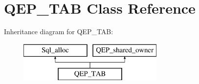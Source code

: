 \hypertarget{classQEP__TAB}{}\section{Q\+E\+P\+\_\+\+T\+AB Class Reference}
\label{classQEP__TAB}
Inheritance diagram for Q\+E\+P\+\_\+\+T\+AB\+:\begin{figure}[H]
\begin{center}
\leavevmode
\includegraphics[height=2.000000cm]{classQEP__TAB}
\end{center}
\end{figure}
